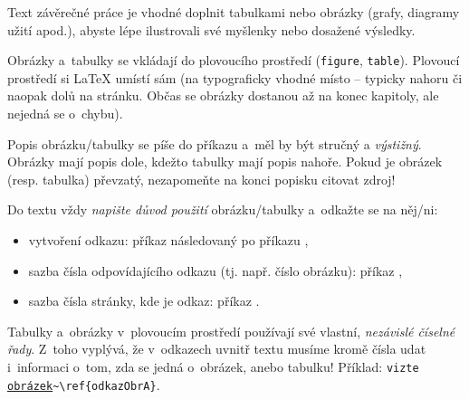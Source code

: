 Text závěrečné práce je vhodné doplnit tabulkami nebo obrázky (grafy, diagramy užití apod.), abyste lépe ilustrovali své myšlenky nebo dosažené výsledky. 
\par 
Obrázky a~tabulky se vkládají do plovoucího prostředí (\texttt{figure}, \texttt{table}). {\color{red} Plovoucí prostředí si LaTeX umístí sám} (na typograficky vhodné místo -- typicky nahoru či naopak dolů na stránku. Občas se obrázky dostanou až na konec kapitoly, ale nejedná se o~chybu).
\par 
Popis obrázku/tabulky se píše do příkazu  a~měl by být stručný a {\em výstižný}. Obrázky mají popis dole, kdežto tabulky mají popis nahoře. Pokud je obrázek (resp. tabulka) převzatý, nezapomeňte na konci popisku citovat zdroj!
\par 
Do textu vždy {\em napište důvod použití\/} obrázku/tabulky a~{\color{red}odkažte se na něj/ni}:
\begin{itemize}
\item vytvoření odkazu: příkaz  následovaný po příkazu ,
\item sazba čísla odpovídajícího odkazu (tj. např. číslo obrázku): příkaz ,
\item sazba čísla stránky, kde je odkaz: příkaz .
\end{itemize}   
Tabulky a~obrázky v~plovoucím prostředí používají své vlastní, {\em nezávislé číselné řady}. Z~toho vyplývá, že v~odkazech uvnitř textu musíme kromě čísla udat i~informaci o~tom, zda se jedná o~obrázek, anebo tabulku! Příklad: \texttt{vizte \underline{obrázek}\textasciitilde\textbackslash ref\{odkazObrA\}}.
\par

